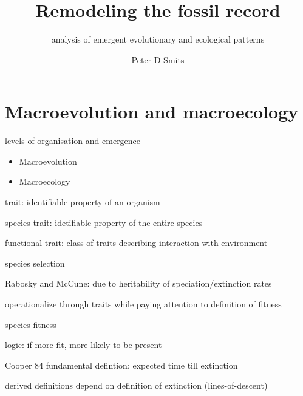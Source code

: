 \documentclass{beamer}
\title{Remodeling the fossil record}
\subtitle{analysis of emergent evolutionary and ecological patterns}
\author{Peter D Smits}
\institute{Committee on Evolutionary Biology, University of Chicago}
\date{}
\begin{document}
\begin{frame}
  \maketitle
\end{frame}

\begin{frame}
  \tableofcontents
\end{frame}

\section{Macroevolution and macroecology}

\begin{frame}
  levels of organisation and emergence
\end{frame}

\begin{frame}
  \begin{definition}
    \begin{itemize}
      \item Macroevolution
      \item Macroecology
    \end{itemize}
  \end{definition}
\end{frame}

\begin{frame}
  trait: identifiable property of an organism

  species trait: idetifiable property of the entire species

  functional trait: class of traits describing interaction with environment
\end{frame}

\begin{frame}
  species selection

  Rabosky and McCune: due to heritability of speciation/extinction rates

  operationalize through traits while paying attention to definition of fitness
\end{frame}

\begin{frame}
  species fitness
  
  logic: if more fit, more likely to be present

  Cooper 84 fundamental defintion: expected time till extinction

  derived definitions depend on definition of extinction (lines-of-descent)
\end{frame}
\end{document}
